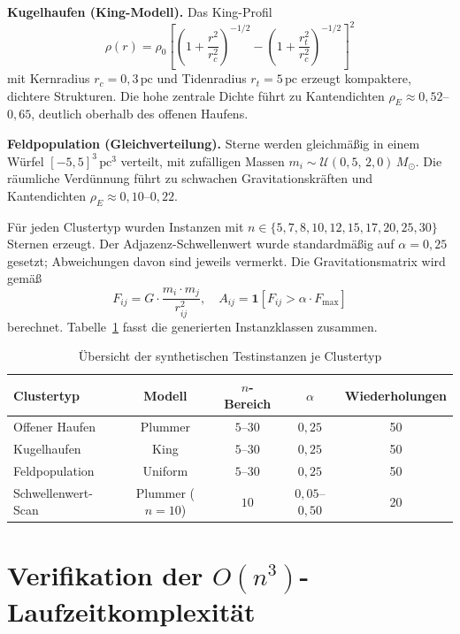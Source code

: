 ﻿\documentclass[a4paper,12pt]{report}
\theoremstyle{definition}
\begin{document}
\textbf{Kugelhaufen (King-Modell).} Das King-Profil
\[
    \rho(r) = \rho_0 \left[\left(1 + \frac{r^2}{r_c^2}\right)^{-1/2} - \left(1 + \frac{r_t^2}{r_c^2}\right)^{-1/2}\right]^2
\]
mit Kernradius $r_c = 0{,}3\,\mathrm{pc}$ und Tidenradius $r_t = 5\,\mathrm{pc}$ erzeugt kompaktere, dichtere Strukturen. Die hohe zentrale Dichte führt zu Kantendichten $\rho_E \approx 0{,}52$--$0{,}65$, deutlich oberhalb des offenen Haufens.

\textbf{Feldpopulation (Gleichverteilung).} Sterne werden gleichmäßig in einem Würfel $[-5,5]^3\,\mathrm{pc}^3$ verteilt, mit zufälligen Massen $m_i \sim \mathcal{U}(0{,}5,\,2{,}0)\,M_\odot$. Die räumliche Verdünnung führt zu schwachen Gravitationskräften und Kantendichten $\rho_E \approx 0{,}10$--$0{,}22$.

Für jeden Clustertyp wurden Instanzen mit $n \in \{5, 7, 8, 10, 12, 15, 17, 20, 25, 30\}$ Sternen erzeugt. Der Adjazenz-Schwellenwert wurde standardmäßig auf $\alpha = 0{,}25$ gesetzt; Abweichungen davon sind jeweils vermerkt. Die Gravitationsmatrix wird gemäß
\[
    F_{ij} = G \cdot \frac{m_i \cdot m_j}{r_{ij}^2}, \quad A_{ij} = \mathbf{1}[F_{ij} > \alpha \cdot F_{\max}]
\]
berechnet. Tabelle~\ref{tab:instanzen} fasst die generierten Instanzklassen zusammen.

\begin{table}[H]
\centering
\caption{Übersicht der synthetischen Testinstanzen je Clustertyp}
\label{tab:instanzen}
\begin{tabular}{lcccc}
\toprule
Clustertyp & Modell & $n$-Bereich & $\alpha$ & Wiederholungen \\
\midrule
Offener Haufen   & Plummer & $5$--$30$ & $0{,}25$ & 50 \\
Kugelhaufen      & King    & $5$--$30$ & $0{,}25$ & 50 \\
Feldpopulation   & Uniform & $5$--$30$ & $0{,}25$ & 50 \\
Schwellenwert-Scan & Plummer ($n=10$) & $10$ & $0{,}05$--$0{,}50$ & 20 \\
\bottomrule
\end{tabular}
\end{table}

\section{Verifikation der $O(n^3)$-Laufzeitkomplexität}
\label{sec:empirie_laufzeit}
\end{document}
